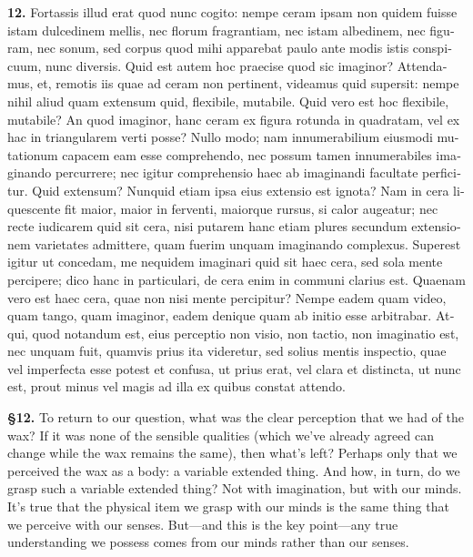 \beginnumbering
\pstart
\begin{latin}
    \textenglish{\textbf{12.}} Fortassis illud erat quod nunc cogito: nempe ceram ipsam non quidem fuisse istam dulcedinem mellis, nec florum fragrantiam, nec istam albedinem, nec figuram, nec sonum, sed corpus quod mihi apparebat paulo ante modis istis conspicuum, nunc diversis. Quid est autem hoc praecise quod sic imaginor? Attendamus, et, remotis iis quae ad ceram non pertinent, videamus quid supersit: nempe nihil aliud quam extensum quid, flexibile, mutabile. Quid vero est hoc flexibile, mutabile? An quod imaginor, hanc ceram ex figura rotunda in quadratam, vel ex hac in triangularem verti posse? Nullo modo; nam innumerabilium eiusmodi mutationum capacem eam esse comprehendo, nec possum tamen innumerabiles imaginando percurrere; nec igitur comprehensio haec ab imaginandi facultate perficitur. Quid extensum? Nunquid etiam ipsa eius extensio est ignota? Nam in cera liquescente fit maior, maior in ferventi, maiorque rursus, si calor augeatur; nec recte iudicarem quid sit cera, nisi putarem hanc etiam plures secundum extensionem varietates admittere, quam fuerim unquam imaginando complexus. Superest igitur ut concedam, me nequidem imaginari quid sit haec cera, sed sola mente percipere; dico hanc in particulari, de cera enim in communi clarius est. Quaenam vero est haec cera, quae non nisi mente percipitur? Nempe eadem quam video, quam tango, quam imaginor, eadem denique quam ab initio esse arbitrabar. Atqui, quod notandum est, eius perceptio non visio, non tactio, non imaginatio est, nec unquam fuit, quamvis prius ita videretur, sed solius mentis inspectio, quae vel imperfecta esse potest et confusa, ut prius erat, vel clara et distincta, ut nunc est, prout minus vel magis ad illa ex quibus constat attendo.
\end{latin}
\pend
\endnumbering

\prenotes

\textbf{§12.} To return to our question, what was the clear perception that we had of the wax? If it was none of the sensible qualities (which we've already agreed can change while the wax remains the same), then what's left? Perhaps only that we perceived the wax as a body: a variable extended thing. And how, in turn, do we grasp such a variable extended thing? Not with imagination, but with our minds. It's true that the physical item we grasp with our minds is the same thing that we perceive with our senses. But---and this is the key point---any true understanding we possess comes from our minds rather than our senses.

